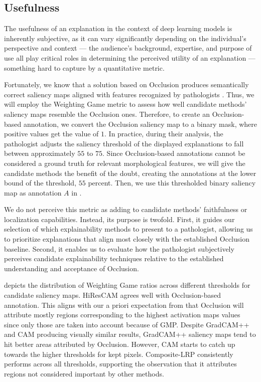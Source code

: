 \subsection*{Usefulness}

The usefulness of an explanation in the context of deep learning models is inherently subjective, as it can vary significantly depending on the individual's perspective and context --- the audience's background, expertise, and purpose of use all play critical roles in determining the perceived utility of an explanation \cite{xai-doshi} --- something hard to capture by a quantitative metric.

Fortunately, we know that a solution based on Occlusion produces semantically correct saliency maps aligned with features recognized by pathologists \cite{gallo}.
Thus, we will employ the Weighting Game metric to assess how well candidate methods' saliency maps resemble the Occlusion ones.
Therefore, to create an Occlusion-based annotation, we convert the Occlusion saliency map to a binary mask, where positive values get the value of $1$.
In practice, during their analysis, the pathologist adjusts the saliency threshold of the displayed explanations to fall between approximately $55$ to $75$.
Since Occlusion-based annotations cannot be considered a ground truth for relevant morphological features, we will give the candidate methods the benefit of the doubt, creating the annotations at the lower bound of the threshold, $55$ percent.
Then, we use this thresholded binary saliency map as annotation $A$ in .

We do not perceive this metric as adding to candidate methods' faithfulness or localization capabilities.
Instead, its purpose is twofold.
First, it guides our selection of which explainability methods to present to a pathologist, allowing us to prioritize explanations that align most closely with the established Occlusion baseline.
Second, it enables us to evaluate how the pathologist subjectively perceives candidate explainability techniques relative to the established understanding and acceptance of Occlusion.

 depicts the distribution of Weighting Game ratios across different thresholds for candidate saliency maps.
HiResCAM agrees well with Occlusion-based annotation.
This aligns with our a priori expectation from  that Occlusion will attribute mostly regions corresponding to the highest activation maps values since only those are taken into account because of GMP.
Despite GradCAM++ and CAM producing visually similar results, GradCAM++ saliency maps tend to hit better areas attributed by Occlusion.
However, CAM starts to catch up towards the higher thresholds for kept pixels.
Composite-LRP consistently performs across all thresholds, supporting the observation that it attributes regions not considered important by other methods.


